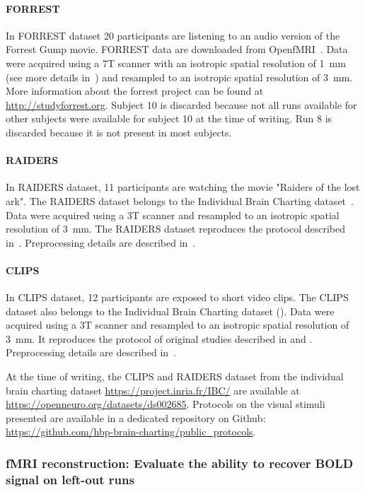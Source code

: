 \paragraph{FORREST}
In FORREST dataset 20 participants are listening to an audio version of the Forrest Gump  movie.
%
FORREST data are downloaded from OpenfMRI~\cite{poldrack2013toward}. 
%
Data were acquired using a 7T scanner with an isotropic spatial resolution of 1~mm (see more details in~\cite{hanke2014high}) and resampled to an isotropic spatial resolution of 3~mm.
%
More information about the forrest project can be found at \url{http://studyforrest.org}.
%
Subject 10 is discarded because not all runs available for other subjects were available for subject 10 at the time of writing.
%
Run 8 is discarded because it is not present in most subjects.
 
\paragraph{RAIDERS}
In RAIDERS dataset, 11 participants are watching the movie "Raiders of the lost ark".
% 
The RAIDERS dataset belongs to the Individual Brain Charting dataset~\cite{ibc}.
% 
Data were acquired using a 3T scanner and resampled to an isotropic spatial resolution of 3~mm.
% 
The RAIDERS dataset reproduces the protocol described in~\cite{haxby2011common}.
%
Preprocessing details are described in~\cite{ibc}.

\paragraph{CLIPS}
In CLIPS dataset, 12 participants are exposed to short video clips. 
%
The CLIPS dataset also belongs to the Individual Brain Charting dataset (\cite{ibc}).
%
Data were acquired using a 3T scanner and resampled to an isotropic spatial resolution of 3~mm.
%
It reproduces the protocol of original studies described in \cite{nishimoto2011reconstructing} and \cite{huth2012continuous}.
%
Preprocessing details are described in~\cite{ibc}.

At the time of writing, the CLIPS and RAIDERS dataset from the individual brain charting dataset \url{https://project.inria.fr/IBC/} are available at \url{https://openneuro.org/datasets/ds002685}.
%
Protocols on the visual stimuli presented are available in a dedicated repository on Github: \url{https://github.com/hbp-brain-charting/public_protocols}.


\subsubsection{fMRI reconstruction: Evaluate the ability to recover BOLD signal on left-out runs}
\label{reconstruction}


